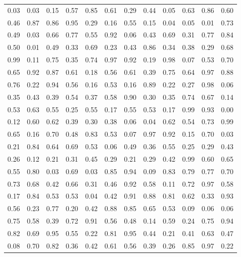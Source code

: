 \begin{center}
\setlength{\tabcolsep}{10pt}
\renewcommand{\arraystretch}{1.25}
\begin{tabular}{llllllllllll}
0.03 & 0.03 & 0.15 & 0.57 & 0.85 & 0.61 & 0.29 & 0.44 & 0.05 & 0.63 & 0.86 & 0.60  \\
0.46 & 0.87 & 0.86 & 0.95 & 0.29 & 0.16 & 0.55 & 0.15 & 0.04 & 0.05 & 0.01 & 0.73  \\
0.49 & 0.03 & 0.66 & 0.77 & 0.55 & 0.92 & 0.06 & 0.43 & 0.69 & 0.31 & 0.77 & 0.84  \\
0.50 & 0.01 & 0.49 & 0.33 & 0.69 & 0.23 & 0.43 & 0.86 & 0.34 & 0.38 & 0.29 & 0.68  \\
0.99 & 0.11 & 0.75 & 0.35 & 0.74 & 0.97 & 0.92 & 0.19 & 0.98 & 0.07 & 0.53 & 0.70  \\
0.65 & 0.92 & 0.87 & 0.61 & 0.18 & 0.56 & 0.61 & 0.39 & 0.75 & 0.64 & 0.97 & 0.88  \\
0.76 & 0.22 & 0.94 & 0.56 & 0.16 & 0.53 & 0.16 & 0.89 & 0.22 & 0.27 & 0.98 & 0.06  \\
0.35 & 0.43 & 0.39 & 0.54 & 0.37 & 0.58 & 0.90 & 0.30 & 0.35 & 0.74 & 0.67 & 0.14  \\
0.53 & 0.63 & 0.55 & 0.25 & 0.55 & 0.17 & 0.55 & 0.53 & 0.17 & 0.99 & 0.93 & 0.00  \\
0.12 & 0.60 & 0.62 & 0.39 & 0.30 & 0.38 & 0.06 & 0.04 & 0.62 & 0.54 & 0.73 & 0.99  \\
0.65 & 0.16 & 0.70 & 0.48 & 0.83 & 0.53 & 0.07 & 0.97 & 0.92 & 0.15 & 0.70 & 0.03  \\
0.21 & 0.84 & 0.64 & 0.69 & 0.53 & 0.06 & 0.49 & 0.36 & 0.55 & 0.25 & 0.29 & 0.43  \\
0.26 & 0.12 & 0.21 & 0.31 & 0.45 & 0.29 & 0.21 & 0.29 & 0.42 & 0.99 & 0.60 & 0.65  \\
0.55 & 0.80 & 0.03 & 0.69 & 0.03 & 0.85 & 0.94 & 0.09 & 0.83 & 0.79 & 0.77 & 0.70  \\
0.73 & 0.68 & 0.42 & 0.66 & 0.31 & 0.46 & 0.92 & 0.58 & 0.11 & 0.72 & 0.97 & 0.58  \\
0.17 & 0.84 & 0.53 & 0.53 & 0.04 & 0.42 & 0.91 & 0.88 & 0.81 & 0.62 & 0.33 & 0.93  \\
0.56 & 0.23 & 0.77 & 0.20 & 0.42 & 0.88 & 0.85 & 0.65 & 0.53 & 0.09 & 0.06 & 0.06  \\
0.75 & 0.58 & 0.39 & 0.72 & 0.91 & 0.56 & 0.48 & 0.14 & 0.59 & 0.24 & 0.75 & 0.94  \\
0.82 & 0.69 & 0.95 & 0.55 & 0.22 & 0.81 & 0.95 & 0.44 & 0.21 & 0.41 & 0.63 & 0.47  \\
0.08 & 0.70 & 0.82 & 0.36 & 0.42 & 0.61 & 0.56 & 0.39 & 0.26 & 0.85 & 0.97 & 0.22  \\

\end{tabular}
\end{center}
